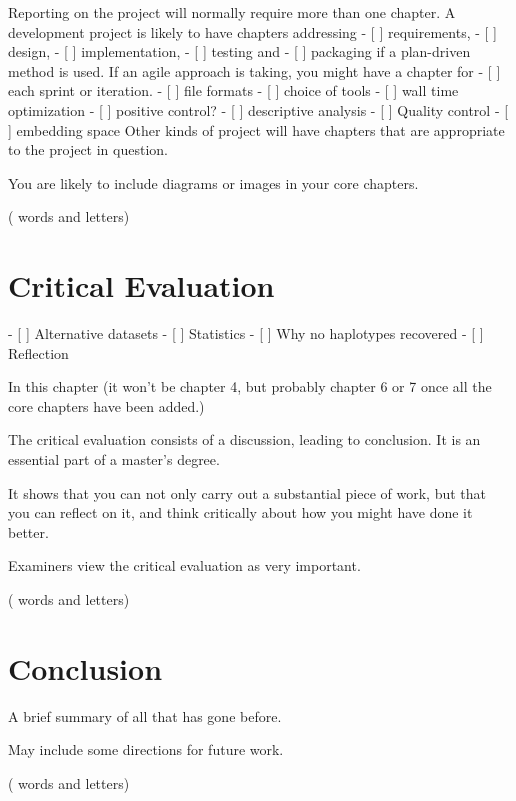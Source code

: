 \documentclass{main}
\newcounter{wordcount}
\newcounter{lettercount}
\begin{document}
\countem

Reporting on the project will normally require more than one chapter.
A development project is likely to have chapters addressing
- [ ] requirements,
- [ ] design,
- [ ] implementation,
- [ ] testing and
- [ ] packaging if a plan-driven method is used.  If an agile approach is taking, you might have a chapter for
- [ ] each sprint or iteration.
- [ ] file formats
- [ ] choice of tools
- [ ] wall time optimization
- [ ] positive control?
- [ ] descriptive analysis
- [ ] Quality control
- [ ] embedding space
Other kinds of project will have chapters that are appropriate to the project in question.

You are likely to include diagrams or images in your core chapters.


\endcountem
(\thewordcount{} words and \thelettercount{} letters)

\chapter{Critical Evaluation}

\countem

- [ ] Alternative datasets
- [ ] Statistics
- [ ] Why no haplotypes recovered
- [ ] Reflection


In this chapter (it won’t be chapter 4, but probably chapter 6 or 7 once all the core chapters have been added.)

The critical evaluation consists of a discussion, leading to conclusion.  It is an essential part of a master’s degree.

It shows that you can not only carry out a substantial piece of work, but that you can reflect on it, and think critically about how you might have done it better.

Examiners view the critical evaluation as very important.

\endcountem
(\thewordcount{} words and \thelettercount{} letters)

\chapter{Conclusion}

\countem

A brief summary of all that has gone before.

May include some directions for future work.


\endcountem
(\thewordcount{} words and \thelettercount{} letters)



\end{document}
